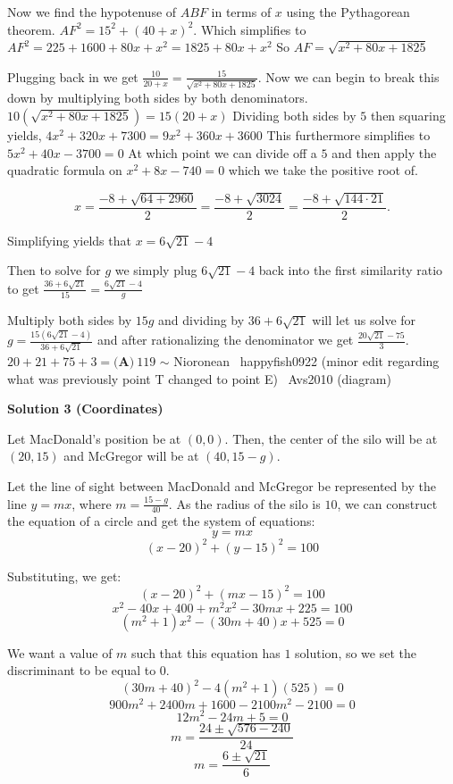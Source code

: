 \begin{enumerate}
 
Now we find the hypotenuse of $ABF$ in terms of $x$ using the Pythagorean theorem. $AF^2=15^2+(40+x)^2$. Which simplifies to $AF^2=225+1600+80x+x^2=1825+80x+x^2$   So $AF=\sqrt{x^2+80x+1825}$

 
Plugging back in we get $\frac{10}{20+x}=\frac{15}{\sqrt{x^2+80x+1825}}$. Now we can begin to break this down by multiplying both sides by both denominators. $10(\sqrt{x^2+80x+1825})=15(20+x)$ Dividing both sides by $5$ then squaring yields, $4x^2+320x+7300=9x^2+360x+3600$  This furthermore simplifies to $5x^2+40x-3700=0$ At which point we can divide off a $5$ and then apply the quadratic formula on $x^2+8x-740=0$ which we take the positive root of.

 

 \[x = \frac{-8+\sqrt{64+2960}}{2} = \frac{-8+\sqrt{3024}}{2} =\frac{-8+\sqrt{144 \cdot 21}}{2}.\]

 
Simplifying yields that $x=6\sqrt{21}-4$

 
Then to solve for $g$ we simply plug $6\sqrt{21}-4$ back into the first similarity ratio to get $\frac{36+6\sqrt{21}}{15}=\frac{6\sqrt{21}-4}{g}$

 
Multiply both sides by $15g$ and dividing by $36+6\sqrt{21}$ will let us solve for $g=\frac{15(6\sqrt{21}-4)}{36+6\sqrt{21}}$ and after rationalizing the denominator we get $\frac{20\sqrt{21}-75}{3}$. $20+21+75+3=\boxed{\textbf{(A)}~119}$
$\sim$ Nioronean~ happyfish0922 (minor edit regarding what was previously point T changed to point E)~ Avs2010 (diagram)

 



\textbf{Solution 3 (Coordinates)}

Let MacDonald's position be at $(0,0)$. Then, the center of the silo will be at $(20,15)$ and McGregor will be at $(40, 15-g)$.

 Let the line of sight between MacDonald and McGregor be represented by the line $y=mx$, where $m=\frac{15-g}{40}$. As the radius of the silo is $10$, we can construct the equation of a circle and get the system of equations: 
 \[y=mx\] 
 \[(x-20)^2+(y-15)^2=100\]

 Substituting, we get: 
 \[(x-20)^2+(mx-15)^2=100\] 
 \[x^2-40x+400+m^2x^2-30mx+225=100\] 
 \[(m^2+1)x^2-(30m+40)x+525=0\]

 We want a value of $m$ such that this equation has $1$ solution, so we set the discriminant to be equal to $0$. 
 \[(30m+40)^2-4(m^2+1)(525)=0\] 
 \[900m^2+2400m+1600-2100m^2-2100=0\] 
 \[12m^2-24m+5=0\] 
 \[m=\frac{24 \pm \sqrt{576-240}}{24}\] 
 \[m=\frac{6 \pm \sqrt{21}}{6}\]


\end{enumerate}
